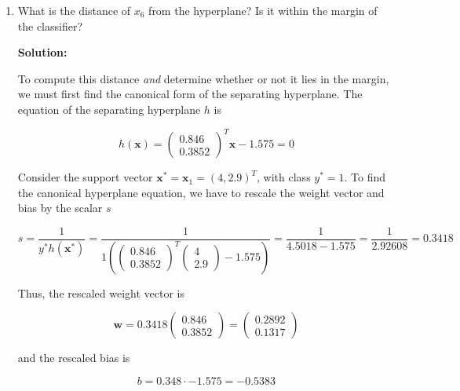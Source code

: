 \documentclass[11pt]{article}
\begin{document}
\begin{enumerate}
\begin{enumerate}
\item What is the distance of $x_6$ from the hyperplane? Is it within the margin of the classifier?

\textbf{Solution:}

To compute this distance \textit{and} determine whether or not it lies in the margin, we must first find the canonical form of the separating hyperplane. The equation of the separating hyperplane $h$ is

\begin{equation*}
h(\mathbf{x}) = \left( \begin{array}{c} 0.846 \\ 0.3852 \end{array} \right)^\mathit{T} \mathbf{x} - 1.575 = 0
\end{equation*}

Consider the support vector $\mathbf{x}^* = \mathbf{x}_1 = (4,2.9)^\mathit{T}$, with class $y^* = 1$. To find the canonical hyperplane equation, we have to rescale the weight vector and bias by the scalar $s$

\begin{equation*}
s = \frac{1}{y^*h(\mathbf{x}^*)} = \frac{1}{1\left(
\left(
\begin{array}{c}
0.846 \\ 0.3852
\end{array}
\right)^\mathit{T}
\left(
\begin{array}{c}
4 \\ 2.9
\end{array}
\right) - 1.575 \right)}
=
\frac{1}{4.5018 - 1.575}
=
\frac{1}{2.92608}
=
0.3418
\end{equation*}

Thus, the rescaled weight vector is

\begin{equation*}
\mathbf{w} = 0.3418
\left(
\begin{array}{c}
0.846 \\ 0.3852
\end{array}
\right)
=
\left(
\begin{array}{c}
0.2892 \\ 0.1317
\end{array}
\right)
\end{equation*}

and the rescaled bias is

\begin{equation*}
b = 0.348 \cdot -1.575 = -0.5383
\end{equation*}


\end{enumerate}
\end{enumerate}
\end{document}
